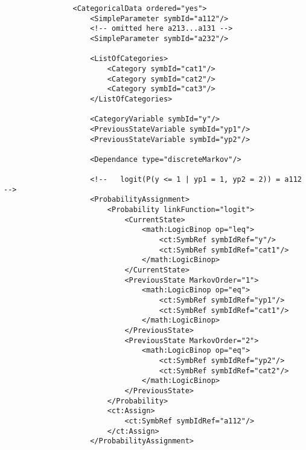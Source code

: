 \lstset{language=XML}
\begin{lstlisting}
                <CategoricalData ordered="yes">
                    <SimpleParameter symbId="a112"/>
                    <!-- omitted here a213...a131 -->
                    <SimpleParameter symbId="a232"/>
                    
                    <ListOfCategories> 
                        <Category symbId="cat1"/>
                        <Category symbId="cat2"/>
                        <Category symbId="cat3"/>
                    </ListOfCategories>
                    
                    <CategoryVariable symbId="y"/>
                    <PreviousStateVariable symbId="yp1"/>
                    <PreviousStateVariable symbId="yp2"/>
                    
                    <Dependance type="discreteMarkov"/>
                    
                    <!--   logit(P(y <= 1 | yp1 = 1, yp2 = 2)) = a112 -->
                    <ProbabilityAssignment>
                        <Probability linkFunction="logit">
                            <CurrentState>
                                <math:LogicBinop op="leq">
                                    <ct:SymbRef symbIdRef="y"/>
                                    <ct:SymbRef symbIdRef="cat1"/>
                                </math:LogicBinop>
                            </CurrentState>
                            <PreviousState MarkovOrder="1">
                                <math:LogicBinop op="eq">
                                    <ct:SymbRef symbIdRef="yp1"/>
                                    <ct:SymbRef symbIdRef="cat1"/>
                                </math:LogicBinop>
                            </PreviousState>
                            <PreviousState MarkovOrder="2">
                                <math:LogicBinop op="eq">
                                    <ct:SymbRef symbIdRef="yp2"/>
                                    <ct:SymbRef symbIdRef="cat2"/>
                                </math:LogicBinop>
                            </PreviousState>
                        </Probability>
                        <ct:Assign>
                            <ct:SymbRef symbIdRef="a112"/>
                        </ct:Assign>
                    </ProbabilityAssignment>
                    

\end{lstlisting}
